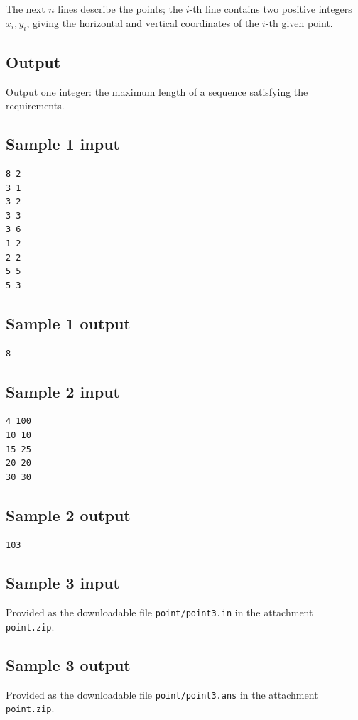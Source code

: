 \documentclass[11pt]{article}
\begin{document}
The next $n$ lines describe the points; the
$i$-th line contains two positive integers
$x_i,y_i$, giving the horizontal and vertical coordinates of the
$i$-th given point.

\subsection*{Output}
Output one integer: the maximum length of a sequence satisfying
the requirements.

\subsection*{Sample 1 input}
\begin{verbatim}
8 2
3 1
3 2
3 3
3 6
1 2
2 2
5 5
5 3
\end{verbatim}

\subsection*{Sample 1 output}
\begin{verbatim}
8
\end{verbatim}

\subsection*{Sample 2 input}
\begin{verbatim}
4 100
10 10
15 25
20 20
30 30
\end{verbatim}

\subsection*{Sample 2 output}
\begin{verbatim}
103
\end{verbatim}

\subsection*{Sample 3 input}
Provided as the downloadable file \texttt{point/point3.in}
in the attachment \texttt{point.zip}.

\subsection*{Sample 3 output}
Provided as the downloadable file \texttt{point/point3.ans}
in the attachment \texttt{point.zip}.
\end{document}
